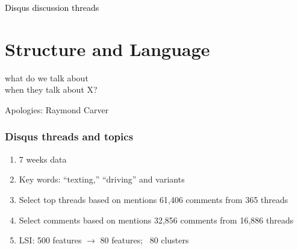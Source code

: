 \documentclass{beamer}
\begin{document}
{
\begin{frame}
\textcolor{black} {
\vfill \hfill \Large Disqus discussion threads}
\end{frame}
}

\section{Structure and Language}
{
\begin{frame}
\textcolor{black} {
\hfill \Huge \insertsection}
\end{frame}
}

\begin{frame}
\begin{center}
{\Huge what do we talk about \\ [15pt] when they talk about X?} 
\end{center}
\hfill Apologies: Raymond Carver \\
\end{frame}

\begin{frame}\frametitle{Disqus threads and topics}
\begin{center}
{\Large 
\begin{enumerate}
\item 7 weeks data
\item Key words: ``texting,'' ``driving'' and variants
\item Select top threads based on mentions 61,406 comments from 365 threads
\item Select comments based on mentions 32,856 comments from 16,886 threads
\item LSI: 500 features $\rightarrow$ 80 features; ~80 clusters
\end{enumerate}
}
\end{center}
\end{frame}
\end{document}
